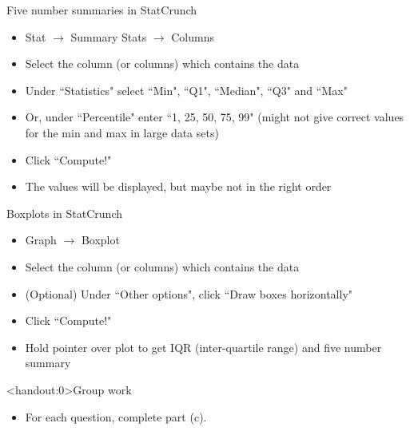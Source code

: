 \documentclass[xcolor=table]{beamer}
\begin{document}
\begin{frame}{Five number summaries in StatCrunch}
\begin{block}{}
\begin{itemize}
\item Stat $\to$ Summary Stats $\to$ Columns
\item Select the column (or columns) which contains the data
\item Under ``Statistics" select ``Min", ``Q1", ``Median", ``Q3" and ``Max"
\item Or, under ``Percentile" enter ``1, 25, 50, 75, 99" (might not give correct values for the min and max in large data sets)
\item Click ``Compute!"
\item The values will be displayed, but maybe not in the right order
\end{itemize}
\end{block}

\end{frame}

\begin{frame}{Boxplots in StatCrunch}
\begin{block}{}
\begin{itemize}
\item Graph $\to$ Boxplot
\item Select the column (or columns) which contains the data
\item (Optional) Under ``Other options", click ``Draw boxes horizontally"
\item Click ``Compute!"
\item Hold pointer over plot to get IQR (inter-quartile range) and five number summary
\end{itemize}
\end{block}

\end{frame}

\begin{frame}<handout:0>{Group work}
\begin{block}{}
\large
\begin{itemize}
\item For each question, complete part (c).
\end{itemize}
\end{block}
\end{frame}
\end{document}
